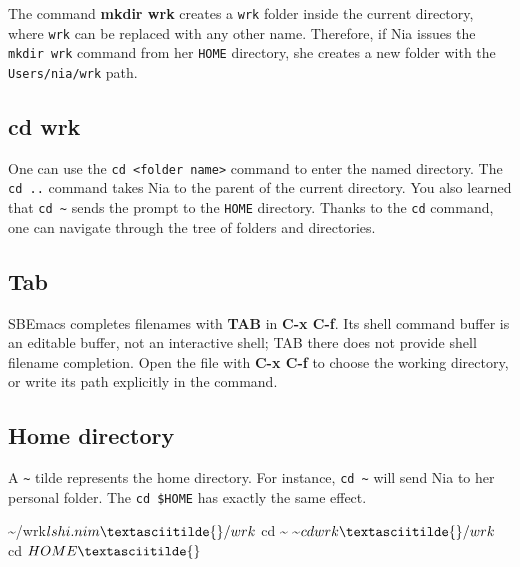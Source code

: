 \documentclass[
  12pt,
]{book}
\newenvironment{Shaded}{}{}
\newcommand{\NormalTok}[1]{#1}
\begin{document}
The command \textbf{mkdir wrk} creates a \texttt{wrk} folder inside the
current directory, where \texttt{wrk} can be replaced with any other
name. Therefore, if Nia issues the \texttt{mkdir\ wrk} command from her
\texttt{HOME} directory, she creates a new folder with the
\texttt{Users/nia/wrk} path.

\subsection*{cd wrk}\label{cd}

One can use the \texttt{cd\ \textless{}folder\ name\textgreater{}}
command to enter the named directory. The \texttt{cd\ ..} command takes
Nia to the parent of the current directory. You also learned that
\texttt{cd\ \textasciitilde{}} sends the prompt to the \texttt{HOME}
directory. Thanks to the \texttt{cd} command, one can navigate through
the tree of folders and directories.

\subsection*{Tab}\label{Tab}

SBEmacs completes filenames with \textbf{TAB} in \textbf{C-x C-f}. Its
shell command buffer is an editable buffer, not an interactive shell;
TAB there does not provide shell filename completion. Open the file with
\textbf{C-x C-f} to choose the working directory, or write its path
explicitly in the command.

\subsection*{Home directory}\label{Home}

A \texttt{\textasciitilde{}} tilde represents the home directory. For
instance, \texttt{cd\ \textasciitilde{}} will send Nia to her personal
folder. The \texttt{cd\ \$HOME} has exactly the same effect.

\begin{Shaded}
\begin{Highlighting}[]
\NormalTok{\textasciitilde{}/wrk$ ls}
\NormalTok{hi.nim}
\NormalTok{\textasciitilde{}/wrk$ cd \textasciitilde{}}
\NormalTok{\textasciitilde{}$ cd wrk}
\NormalTok{\textasciitilde{}/wrk$ cd $HOME}
\NormalTok{\textasciitilde{}$}
\end{Highlighting}
\end{Shaded}
\end{document}
